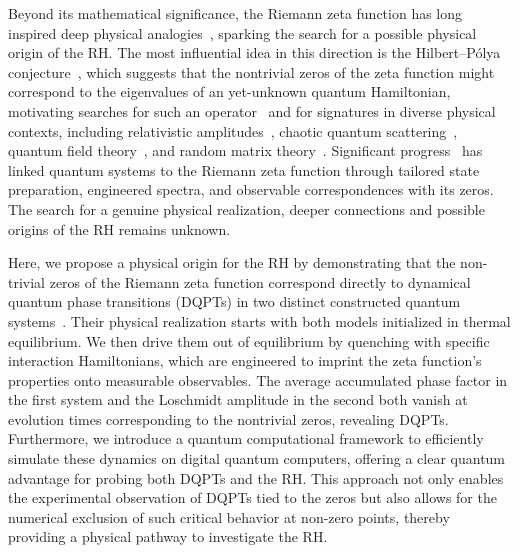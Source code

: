 \documentclass[aps,pra,twocolumn,superscriptaddress,preprintnumbers,amsmath,amssymb]{revtex4-2}
\begin{document}
  
  Beyond its mathematical significance, the Riemann zeta function has long inspired deep physical analogies~\cite{schumayer2011colloquium}, sparking the search for a possible physical origin of the RH. The most influential idea in this direction is the Hilbert–Pólya conjecture~\cite{berry2005riemann,berry1992new},  which suggests that the nontrivial zeros of the zeta function might correspond to the eigenvalues of an yet-unknown quantum Hamiltonian, motivating searches for such an operator~\cite{srednicki2011nonclassical,bender2017hamiltonian} and for signatures in diverse physical contexts, including relativistic amplitudes~\cite{remmen2021amplitudes}, chaotic quantum scattering~\cite{gutzwiller1983stochastic,bhaduri1995phase}, quantum field theory~\cite{spector1990supersymmetry}, and random matrix theory~\cite{hughes2000random}. Significant progress~\cite{mack2010riemann,feiler2013entanglement,feiler2015dirichlet} has linked quantum systems to the Riemann zeta function through tailored state preparation, engineered spectra, and observable correspondences with its zeros. The search for a genuine physical realization, deeper connections and possible origins of the RH  remains unknown.

Here, we propose a physical origin for the RH by demonstrating that the non-trivial zeros of the Riemann zeta function correspond directly to dynamical quantum phase transitions (DQPTs) in two distinct constructed quantum systems~\cite{heyl2018dynamical,heyl2013dynamical,karrasch2013dynamical,heyl2017dynamical,bhattacharya2017mixed,lang2018dynamical,muniz2020exploring,zhou2018dynamical}. 
 Their physical realization starts with both models initialized in thermal equilibrium. We then drive them out of equilibrium by quenching with specific interaction Hamiltonians, which are engineered to imprint the zeta function's properties onto measurable observables. The average accumulated phase factor in the first system and the Loschmidt amplitude in the second both vanish at evolution times corresponding to the nontrivial zeros, revealing DQPTs. 
 Furthermore, we introduce a quantum computational framework to efficiently simulate these dynamics on digital quantum computers, offering a clear quantum advantage for probing both DQPTs and the RH. This approach not only enables the experimental observation of DQPTs tied to the zeros but also allows for the numerical exclusion of such critical behavior at non-zero points, thereby providing a physical pathway to investigate the RH.
\end{document}
